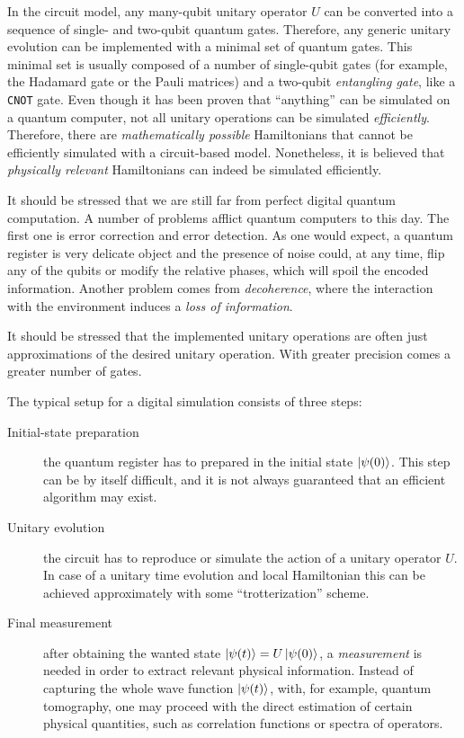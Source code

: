 In the circuit model, any many-qubit unitary operator $U$ can be converted into a sequence of single- and two-qubit quantum gates.
Therefore, any generic unitary evolution can be implemented with a minimal set of quantum gates\citneeded.
This minimal set is usually composed of a number of single-qubit gates (for example, the Hadamard gate or the Pauli matrices) and a two-qubit \emph{entangling gate}, like a \texttt{CNOT} gate.
Even though it has been proven \cite{lloyd1996simulator} that ``anything'' can be simulated on a quantum computer, not all unitary operations can be simulated \emph{efficiently}.
Therefore, there are \emph{mathematically possible} Hamiltonians that cannot be efficiently simulated with a circuit-based model.
Nonetheless, it is believed that \emph{physically relevant} Hamiltonians can indeed be simulated efficiently\citneeded.

It should be stressed that we are still far from perfect digital quantum computation.
A number of problems afflict quantum computers to this day.
The first one is error correction and error detection.
As one would expect, a quantum register is very delicate object and the presence of noise could, at any time, flip any of the qubits or modify the relative phases, which will spoil the encoded information.
Another problem comes from \emph{decoherence}, where the interaction with the environment induces a \emph{loss of information}.



It should be stressed that the implemented unitary operations are often just approximations of the desired unitary operation.
With greater precision comes a greater number of gates.

The typical setup for a digital simulation consists of three steps:
\begin{description}
    \item[Initial-state preparation] the quantum register has to prepared in the initial state $\ket{\psi(0)}$.
        This step can be by itself difficult, and it is not always guaranteed that an efficient algorithm may exist.

    \item[Unitary evolution]  the circuit has to reproduce or simulate the action of a unitary operator $U$.
        In case of a unitary time evolution and local Hamiltonian this can be achieved approximately with some ``trotterization'' scheme.

    \item[Final measurement] after obtaining the wanted state $\ket{\psi(t)} = U \ket{\psi(0)}$, a \emph{measurement} is needed in order to extract relevant physical information.
        Instead of capturing the whole wave function $\ket{\psi(t)}$, with, for example, quantum tomography, one may proceed with the direct estimation of certain physical quantities, such as correlation functions or spectra of operators.
\end{description}


